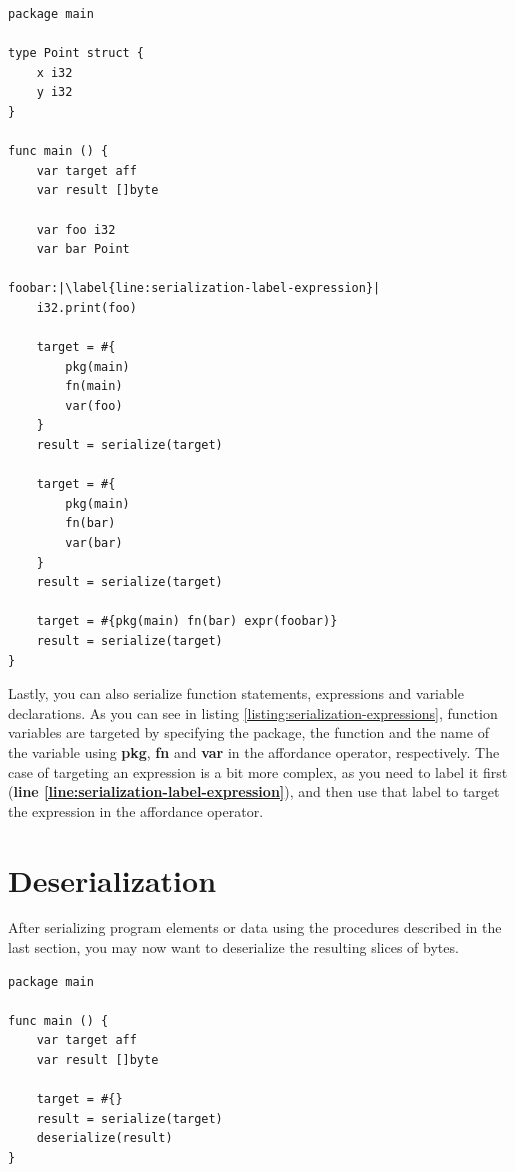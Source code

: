 \documentclass[11pt,fleqn,openany]{book} %
\begin{document}
\begin{lstlisting}[caption={Serialization of expressions},captionpos=b,label={listing:serialization-expressions}]
package main

type Point struct {
    x i32
    y i32
}

func main () {
    var target aff
    var result []byte
    
    var foo i32
    var bar Point
    
foobar:|\label{line:serialization-label-expression}|
    i32.print(foo)

    target = #{
        pkg(main)
        fn(main)
        var(foo)
    }
    result = serialize(target)
    
    target = #{
        pkg(main)
        fn(bar)
        var(bar)
    }
    result = serialize(target)
    
    target = #{pkg(main) fn(bar) expr(foobar)}
    result = serialize(target)
}
\end{lstlisting}

Lastly, you can also serialize function statements, expressions and variable declarations. As you can see in listing \ref{listing:serialization-expressions}, function variables are targeted by specifying the package, the function and the name of the variable using \textbf{pkg}, \textbf{fn} and \textbf{var} in the affordance operator, respectively. The case of targeting an expression is a bit more complex, as you need to label it first (\textbf{line \ref{line:serialization-label-expression}}), and then use that label to target the expression in the affordance operator.

\section{Deserialization}
\label{section:deserialization}

After serializing program elements or data using the procedures described in the last section, you may now want to deserialize the resulting slices of bytes.

\begin{lstlisting}[caption={Deserialization of a program},captionpos=b,label={listing:deserialization-program}]
package main

func main () {
    var target aff
    var result []byte
    
    target = #{}
    result = serialize(target)
    deserialize(result)
}
\end{lstlisting}
\end{document}
